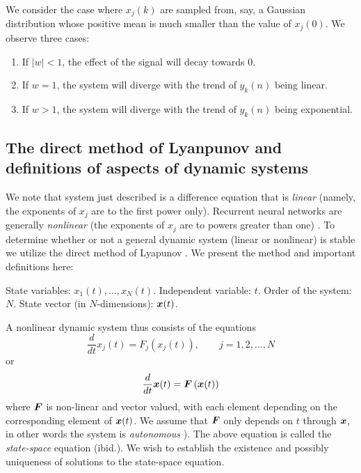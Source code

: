 We consider the case where $x_j(k)$ are sampled from, say, a Gaussian distribution whose positive mean is much smaller than the value of $x_j(0)$. We observe three cases:

\begin{enumerate}
\item If $|w| < 1$, the effect of the signal will decay towards $0$.
\item If $w = 1$, the system will diverge with the trend of $y_k(n)$ being linear. 
\item If $w > 1$, the system will diverge with the trend of $y_k(n)$ being exponential.  
\end{enumerate}

\subsection{The direct method of Lyanpunov and definitions of aspects of dynamic systems}

We note that system just described is a difference equation that is \emph{linear} (namely, the exponents of $x_j$ are to the first power only). Recurrent neural networks are generally \emph{nonlinear} (the exponents of $x_j$ are to powers greater than one) \cite[p. 6]{strogatz:2000}. To determine whether or not a general dynamic system (linear or nonlinear) is stable we utilize the direct method of Lyapunov \cite[p. 674]{Haykin:2009:NNC:1213811}. We present the method and important definitions here:

\begin{definition}
  State variables: $x_1(t), \ldots, x_N(t)$. Independent variable: $t$. Order of the system: $N$. State vector (in $N$-dimensions): $\boldsymbol{x}(t)$.
\end{definition}

A nonlinear dynamic system thus consists of the equations
%
\begin{equation*}
  \frac{d}{dt}x_j(t) = F_j \left(x_j(t)\right), \qquad j = 1, 2, \ldots, N
\end{equation*}
%
or
%
\begin{equation*}
  \frac{d}{dt}\boldsymbol{x}(t) = \boldsymbol{F} \left(\boldsymbol{x}(t)\right)
\end{equation*}
%
where $\boldsymbol{F}$ is non-linear and vector valued, with each element depending on the corresponding element of $\boldsymbol{x}(t)$. We assume that $\boldsymbol{F}$ only depends on $t$ through $\boldsymbol{x}$, in other words the system is \emph{autonomous} \cite[p. 675]{Haykin:2009:NNC:1213811}). The above equation is called the \emph{state-space} equation (ibid.). We wish to establish the existence and possibly uniqueness of solutions to the state-space equation.

